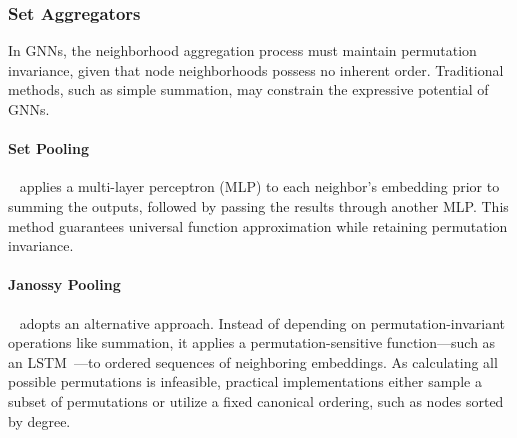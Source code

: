 \subsubsection{Set Aggregators}
In GNNs, the neighborhood aggregation process must maintain permutation invariance, given that node neighborhoods possess no inherent order. Traditional methods, such as simple summation, may constrain the expressive potential of GNNs. 

\paragraph{Set Pooling}~\cite{zaheer2017deepSets} applies a multi-layer perceptron (MLP) to each neighbor’s embedding prior to summing the outputs, followed by passing the results through another MLP. This method guarantees universal function approximation while retaining permutation invariance. 

\paragraph{Janossy Pooling}~\cite{murphy2018janossyPooling} adopts an alternative approach. Instead of depending on permutation-invariant operations like summation, it applies a permutation-sensitive function—such as an LSTM~\cite{hochreiter1997LSTM}—to ordered sequences of neighboring embeddings. As calculating all possible permutations is infeasible, practical implementations either sample a subset of permutations or utilize a fixed canonical ordering, such as nodes sorted by degree.

